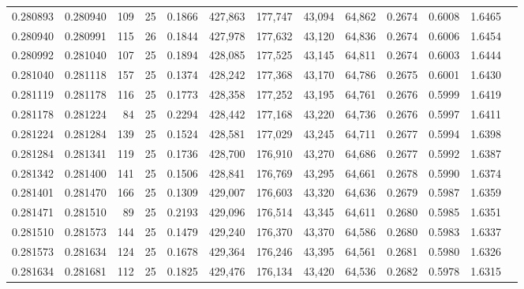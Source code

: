 \begin{tabular}{rrrrrrrrrrrrr}
0.280893 & 0.280940 &   109 &  25 &                                     0.1866 & 427,863 & 177,747 &  43,094 &  64,862 & 0.2674 & 0.6008 & 1.6465 \\
0.280940 & 0.280991 &   115 &  26 &                                     0.1844 & 427,978 & 177,632 &  43,120 &  64,836 & 0.2674 & 0.6006 & 1.6454 \\
0.280992 & 0.281040 &   107 &  25 &                                     0.1894 & 428,085 & 177,525 &  43,145 &  64,811 & 0.2674 & 0.6003 & 1.6444 \\
0.281040 & 0.281118 &   157 &  25 &                                     0.1374 & 428,242 & 177,368 &  43,170 &  64,786 & 0.2675 & 0.6001 & 1.6430 \\
0.281119 & 0.281178 &   116 &  25 &                                     0.1773 & 428,358 & 177,252 &  43,195 &  64,761 & 0.2676 & 0.5999 & 1.6419 \\
0.281178 & 0.281224 &    84 &  25 &                                     0.2294 & 428,442 & 177,168 &  43,220 &  64,736 & 0.2676 & 0.5997 & 1.6411 \\
0.281224 & 0.281284 &   139 &  25 &                                     0.1524 & 428,581 & 177,029 &  43,245 &  64,711 & 0.2677 & 0.5994 & 1.6398 \\
0.281284 & 0.281341 &   119 &  25 &                                     0.1736 & 428,700 & 176,910 &  43,270 &  64,686 & 0.2677 & 0.5992 & 1.6387 \\
0.281342 & 0.281400 &   141 &  25 &                                     0.1506 & 428,841 & 176,769 &  43,295 &  64,661 & 0.2678 & 0.5990 & 1.6374 \\
0.281401 & 0.281470 &   166 &  25 &                                     0.1309 & 429,007 & 176,603 &  43,320 &  64,636 & 0.2679 & 0.5987 & 1.6359 \\
0.281471 & 0.281510 &    89 &  25 &                                     0.2193 & 429,096 & 176,514 &  43,345 &  64,611 & 0.2680 & 0.5985 & 1.6351 \\
0.281510 & 0.281573 &   144 &  25 &                                     0.1479 & 429,240 & 176,370 &  43,370 &  64,586 & 0.2680 & 0.5983 & 1.6337 \\
0.281573 & 0.281634 &   124 &  25 &                                     0.1678 & 429,364 & 176,246 &  43,395 &  64,561 & 0.2681 & 0.5980 & 1.6326 \\
0.281634 & 0.281681 &   112 &  25 &                                     0.1825 & 429,476 & 176,134 &  43,420 &  64,536 & 0.2682 & 0.5978 & 1.6315 \\

\end{tabular}
